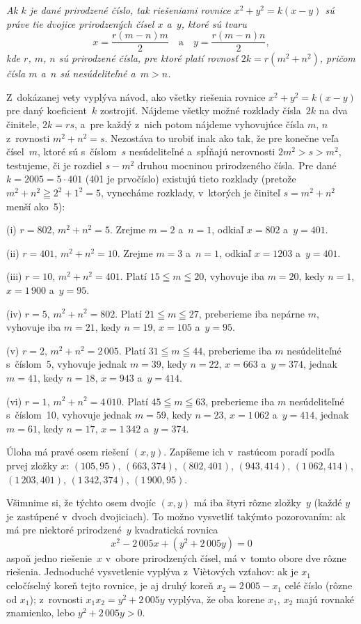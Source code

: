 {\smallskip
{\it
Ak $k$ je dané prirodzené číslo, tak riešeniami rovnice
$x^2+y^2=k(x-y)$ sú práve tie dvojice prirodzených
čísel $x$ a~$y$, ktoré sú tvaru
$$
x=\frac{r(m-n)m}{2}\quad\text{a}\quad
y=\frac{r(m-n)n}{2},
$$
kde $r$, $m$, $n$ sú prirodzené čísla, pre ktoré platí rovnosť
$2k=r(m^2+n^2)$, pričom čísla $m$ a~$n$ sú nesúdeliteľné a~$m>n$.
}

\smallskip
Z~dokázanej vety vyplýva návod, ako všetky riešenia rovnice
$x^2+y^2=k(x-y)$ pre daný koeficient~$k$ zostrojiť. Nájdeme
všetky možné rozklady čísla~$2k$ na dva činitele, $2k=rs$, a~pre
každý z~nich potom nájdeme vyhovujúce čísla $m$, $n$ z~rovnosti
$m^2+n^2=s$. Nezostáva to urobiť inak ako tak,
že pre konečne veľa čísel~$m$, ktoré sú
s~číslom~$s$ nesúdeliteľné a~spĺňajú nerovnosti $2m^2>s>m^2$,
testujeme, či je rozdiel $s-m^2$ druhou mocninou prirodzeného
čísla. Pre dané $k=2005=5\cdot401$ (401
je prvočíslo) existujú tieto rozklady (pretože
$m^2+n^2\geqq2^2+1^2=5$, vynecháme rozklady,
v~ktorých je činiteľ $s=m^2+n^2$ menší ako~5):

\item{(i)} $r=802$, $m^2+n^2=5$. Zrejme $m=2$ a~$n=1$, odkiaľ
$x=802$ a~$y=401$.

\item{(ii)} $r=401$, $m^2+n^2=10$. Zrejme $m=3$ a~$n=1$, odkiaľ
$x=1203$ a~$y=401$.

\item{(iii)} $r=10$, $m^2+n^2=401$. Platí $15\leqq m\leqq 20$,
vyhovuje iba $m=20$, kedy $n=1$, $x=1\,900$ a~$y=95$.

\item{(iv)} $r=5$, $m^2+n^2=802$. Platí $21\leqq m\leqq 27$,
preberieme iba nepárne $m$, vyhovuje iba $m=21$,
kedy $n=19$, $x=105$ a~$y=95$.

\item{(v)} $r=2$, $m^2+n^2=2\,005$. Platí $31\leqq m\leqq 44$,
preberieme iba $m$ nesúdeliteľné s~číslom~5,
vyhovuje jednak $m=39$, kedy $n=22$, $x=663$ a~$y=374$, jednak
$m=41$, kedy $n=18$, $x=943$ a~$y=414$.

\item{(vi)} $r=1$, $m^2+n^2=4\,010$. Platí $45\leqq m\leqq 63$,
preberieme iba $m$ nesúdeliteľné s~číslom~10,
vyhovuje jednak $m=59$, kedy $n=23$, $x=1\,062$ a~$y=414$, jednak
$m=61$, kedy $n=17$, $x=1\,342$ a~$y=374$.

\zaver
Úloha má pravé osem riešení $(x,y)$. Zapíšeme ich
v~rastúcom poradí podľa prvej zložky $x$:
$(105,95)$, $(663,374)$, $(802,401)$, $(943,414)$, $(1\,062,414)$,
$(1\,203,401)$, $(1\,342,374)$, $(1\,900,95)$.

Všimnime si, že týchto osem dvojíc $(x,y)$ má iba
štyri rôzne zložky~$y$ (každé $y$ je zastúpené v~dvoch
dvojiciach). To možno vysvetliť takýmto pozorovaním: ak má pre
niektoré prirodzené~$y$ kvadratická rovnica
$$
x^2-2\,005x+(y^2+2\,005y)=0
$$
aspoň jedno riešenie~$x$ v~obore prirodzených čísel, má v~tomto
obore dve rôzne riešenia. Jednoduché vysvetlenie vyplýva z~Vi\`etových
vzťahov: ak je $x_1$ celočíselný koreň tejto rovnice, je aj druhý
koreň $x_2=2\,005-x_1$ celé číslo (rôzne od $x_1$); z~rovnosti
$x_1x_2=y^2+2\,005y$ vyplýva, že oba korene $x_1$, $x_2$ majú rovnaké
znamienko, lebo $y^2+2\,005y>0$.}

